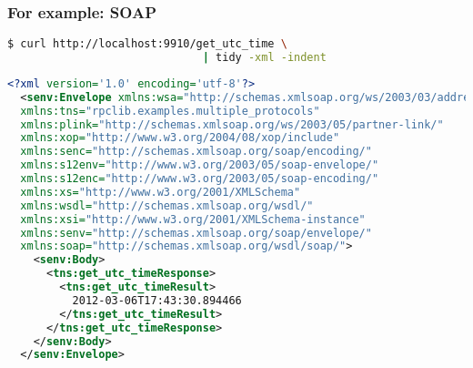 \documentclass{beamer}
\begin{document}
\begin{frame}[fragile]    
  \frametitle{For example: SOAP}

  \begin{lstlisting}[language=sh,frame=topline]
$ curl http://localhost:9910/get_utc_time \
                              | tidy -xml -indent
  \end{lstlisting}
  \tiny
  \begin{lstlisting}[language=xml,frame=bottomline]
  <?xml version='1.0' encoding='utf-8'?>                                                                                                                                                                                          
  <senv:Envelope xmlns:wsa="http://schemas.xmlsoap.org/ws/2003/03/addressing"                                                                                                                                                     
  xmlns:tns="rpclib.examples.multiple_protocols"                                                                                                                                                                                  
  xmlns:plink="http://schemas.xmlsoap.org/ws/2003/05/partner-link/"                                                                                                                                                               
  xmlns:xop="http://www.w3.org/2004/08/xop/include"                                                                                                                                                                               
  xmlns:senc="http://schemas.xmlsoap.org/soap/encoding/"                                                                                                                                                                          
  xmlns:s12env="http://www.w3.org/2003/05/soap-envelope/"                                                                                                                                                                         
  xmlns:s12enc="http://www.w3.org/2003/05/soap-encoding/"                                                                                                                                                                         
  xmlns:xs="http://www.w3.org/2001/XMLSchema"
  xmlns:wsdl="http://schemas.xmlsoap.org/wsdl/"
  xmlns:xsi="http://www.w3.org/2001/XMLSchema-instance"
  xmlns:senv="http://schemas.xmlsoap.org/soap/envelope/"
  xmlns:soap="http://schemas.xmlsoap.org/wsdl/soap/">
    <senv:Body>
      <tns:get_utc_timeResponse>
        <tns:get_utc_timeResult>
          2012-03-06T17:43:30.894466
        </tns:get_utc_timeResult>
      </tns:get_utc_timeResponse>
    </senv:Body>
  </senv:Envelope>
  \end{lstlisting}
\end{frame}
\end{document}
